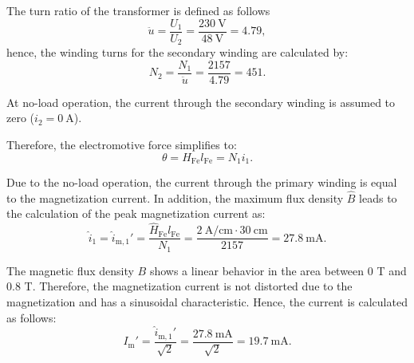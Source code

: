 \begin{solutionblock}
  The turn ratio of the transformer is defined as follows
  \begin{equation}
    \ddot{u} = \frac{U_{\mathrm{1}}}{U_{\mathrm{2}}}
    = \frac{\SI{230}{\volt}}{\SI{48}{\volt}}
    = 4.79,
  \end{equation}
  hence, the winding turns for the secondary winding are calculated by:
  \begin{equation}
    N_{\mathrm{2}} = \frac{N_{\mathrm{1}}}{\ddot{u}}
    = \frac{2157}{4.79}
    = 451.
  \end{equation}

\end{solutionblock}



\begin{solutionblock}
  
  At no-load operation, the current through the secondary winding is assumed to zero ($i_{\mathrm{2}} = \SI{0}{\ampere}$).
  
  Therefore, the electromotive force simplifies to:
  \begin{equation}
    \theta = H_{\mathrm{Fe}} l_{\mathrm{Fe}}
    = N_{\mathrm{1}} i_{\mathrm{1}}.
  \end{equation}

  Due to the no-load operation, the current through the primary winding is equal to the magnetization current. In addition, the maximum flux density $\hat{B}$ leads to the calculation of the peak magnetization current as:
  \begin{equation}
    \hat{i}_{\mathrm{1}} = \hat{i}_{\mathrm{m,1}}'
    = \frac{\hat{H}_{\mathrm{Fe}} l_{\mathrm{Fe}}}{N_{\mathrm{1}}}
    = \frac{\SI{2}{\ampere \per \centi \metre} \cdot \SI{30}{\centi \metre}}{2157}
    = \SI{27.8}{\milli \ampere}.
  \end{equation}


  The magnetic flux density $B$ shows a linear behavior in the area between 0 T and 0.8 T. Therefore, the magnetization current is not distorted due to the magnetization and has a sinusoidal characteristic.
  Hence, the current is calculated as follows:
  \begin{equation}
    I_{\mathrm{m}}' = \frac{\hat{i}_{\mathrm{m,1}}'}{\sqrt{2}}
    = \frac{\SI{27.8}{\milli\ampere}}{\sqrt{2}}
    = \SI{19.7}{\milli \ampere}.
  \end{equation}

  

\end{solutionblock}


